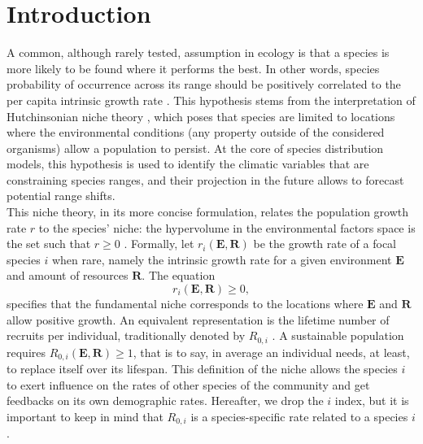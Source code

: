 

\section{Introduction}

A common, although rarely tested, assumption in ecology is that a species is more likely to be found where it performs the best. In other words, species probability of occurrence across its range should be positively correlated to the per capita intrinsic growth rate \citep{McGill2012}. This hypothesis stems from the interpretation of Hutchinsonian niche theory \citep{Hutchinson1957, Maguire1973}, which poses that species are limited to locations where the environmental conditions (\ie any property outside of the considered organisms) allow a population to persist. At the core of species distribution models, this hypothesis is used to identify the climatic variables that are constraining species ranges, and their projection in the future allows to forecast potential range shifts. \\

This niche theory, in its more concise formulation, relates the population growth rate $ r $ to the species' niche: the hypervolume in the environmental factors space is the set such that $ r \geqslant 0 $ \citep{Holt2009, Godsoe2017}. Formally, let $ r_i(\bm{E}, \bm{R}) $ be the growth rate of a focal species $ i $ when rare, namely the intrinsic growth rate for a given environment $ \bm{E} $ and amount of resources $ \bm{R} $. The equation
\[
	r_i(\bm{E}, \bm{R}) \geqslant 0,
\]
specifies that the fundamental niche corresponds to the locations where $ \bm{E} $ and $ \bm{R} $ allow positive growth. An equivalent representation is the lifetime number of recruits per individual, traditionally denoted by $ R_{0, i} $ \citep[where $ i $ is still the species index]{Pulliam2000, DeRoos1997}. A sustainable population requires $ R_{0, i} (\bm{E}, \bm{R}) \geqslant 1 $, that is to say, in average an individual needs, at least, to replace itself over its lifespan. This definition of the niche allows the species $ i $ to exert influence on the rates of other species of the community and get feedbacks on its own demographic rates. Hereafter, we drop the $ i $ index, but it is important to keep in mind that $ R_{0, i} $ is a species-specific rate related to a species $ i $. \\

